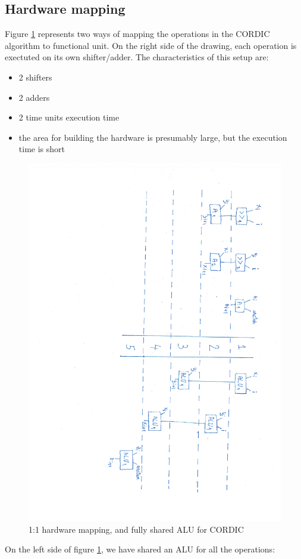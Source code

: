 \documentclass[12pt, a4paper,oneside]{article}
\begin{document}
\subsection{Hardware mapping}
Figure \ref{fig:schedules} represents two ways of mapping the operations in the
CORDIC algorithm to functional unit. On the right side of the drawing, each operation
is exectuted on its own shifter/adder. The characteristics of this setup are:

\begin{itemize}
	\item 2 shifters
	\item 2 adders
	\item 2 time units execution time
	\item the area for building the hardware is presumably large, but the execution time
	is short 
\end{itemize}


\begin{figure}[h]
	\centering
	\includegraphics[height = \textwidth,angle=91, trim=6.5cm 3.5cm 1.5cm 3cm, clip]{schedules.pdf}
	\caption{1:1 hardware mapping, and fully shared ALU for CORDIC}
	\label{fig:schedules}
\end{figure}

On the left side of figure \ref{fig:schedules}, we have shared an ALU for all the 
operations:
\end{document}
